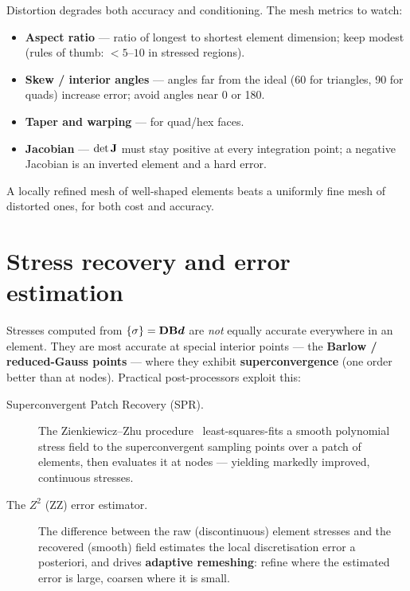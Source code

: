 Distortion degrades both accuracy and conditioning. The mesh metrics to
watch:
\begin{itemize}
  \item \textbf{Aspect ratio} --- ratio of longest to shortest element
        dimension; keep modest (rules of thumb: $<5$--$10$ in stressed
        regions).
  \item \textbf{Skew / interior angles} --- angles far from the ideal
        (60\textdegree{} for triangles, 90\textdegree{} for quads)
        increase error; avoid angles near 0\textdegree{} or 180\textdegree.
  \item \textbf{Taper and warping} --- for quad/hex faces.
  \item \textbf{Jacobian} --- $\det\mathbf{J}$ must stay positive at every
        integration point; a negative Jacobian is an inverted element and
        a hard error.
\end{itemize}
A locally refined mesh of well-shaped elements beats a uniformly fine mesh
of distorted ones, for both cost and accuracy.

\section{Stress recovery and error estimation}

Stresses computed from $\{\sigma\}=\mathbf{D}\mathbf{B}\bm{d}$ are \emph{not} equally
accurate everywhere in an element. They are most accurate at special
interior points --- the \textbf{Barlow / reduced-Gauss points} --- where
they exhibit \textbf{superconvergence} (one order better than at nodes).
Practical post-processors exploit this:

\begin{description}
  \item[Superconvergent Patch Recovery (SPR).] The Zienkiewicz--Zhu
        procedure~\citep{zienkiewicz1992spr} least-squares-fits a smooth
        polynomial stress field to the superconvergent sampling points
        over a patch of elements, then evaluates it at nodes --- yielding
        markedly improved, continuous stresses.
  \item[The $Z^2$ (ZZ) error estimator.] The difference between the raw
        (discontinuous) element stresses and the recovered (smooth) field
        estimates the local discretisation error a posteriori, and drives
        \textbf{adaptive remeshing}: refine where the estimated error is
        large, coarsen where it is small.
\end{description}

